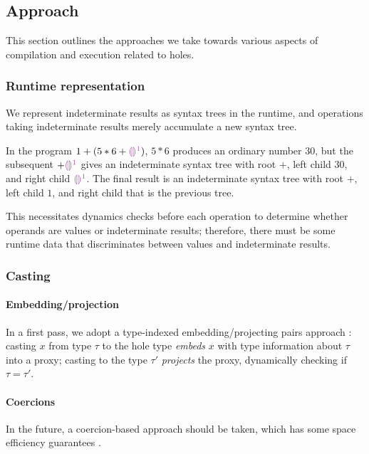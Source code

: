 \documentclass[index.tex]{subfiles}
\begin{document}
\subsection{Approach}
\label{approach}
This section outlines the approaches we take towards various aspects of compilation and execution
related to holes.

\subsubsection{Runtime representation}
\label{runtime-representation}
We represent indeterminate results as syntax trees in the runtime, and operations taking
indeterminate results merely accumulate a new syntax tree.
%
\begin{example}
  In the program $1 + (5 * 6 + \SyEHole{1}{})$, $5 * 6$ produces an ordinary number $30$, but the
  subsequent $+ \SyEHole{1}{}$ gives an indeterminate syntax tree with root $+$, left child $30$, and
  right child $\SyEHole{1}{}$. The final result is an indeterminate syntax tree with root $+$, left
  child $1$, and right child that is the previous tree.
\end{example}
%
\noindent This necessitates dynamics checks before each operation to determine whether operands are
values or indeterminate results; therefore, there must be some runtime data that discriminates
between values and indeterminate results.

\subsubsection{Casting}
\label{casting}

\paragraph{Embedding/projection}
In a first pass, we adopt a type-indexed embedding/projecting pairs approach \cite{benton2005,
new2018}: casting $x$ from type $\tau$ to the hole type \emph{embeds} $x$ with type information
about $\tau$ into a proxy; casting to the type $\tau'$ \emph{projects} the proxy, dynamically
checking if $\tau = \tau'$.

\paragraph{Coercions}
In the future, a coercion-based approach should be taken, which has some space efficiency guarantees
\cite{herman2010, kuhlenschmidt2019}.
\end{document}
